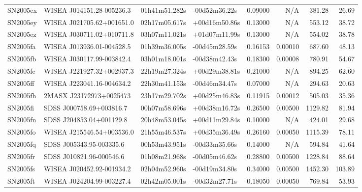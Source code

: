 \begin{longtable}{llllrrrr}
SN2005ex         &       WISEA J014151.28-005236.3 &   01h41m51.282s &   -00d52m36.22s &  0.09000 &      N/A &   381.28 &       26.69 \\
SN2005ey         &       WISEA J021705.62+001651.0 &   02h17m05.617s &   +00d16m50.86s &  0.13000 &      N/A &   553.12 &       38.72 \\
SN2005ez         &       WISEA J030711.02+010711.8 &   03h07m11.021s &   +01d07m11.99s &  0.13000 &      N/A &   554.02 &       38.78 \\
SN2005fa         &       WISEA J013936.01-004528.5 &   01h39m36.005s &   -00d45m28.59s &  0.16153 &  0.00010 &   687.60 &       48.13 \\
SN2005fb         &       WISEA J030117.99-003842.4 &   03h01m18.001s &   -00d38m42.43s &  0.18300 &  0.00008 &   780.91 &       54.67 \\
SN2005fe         &       WISEA J221927.32+002937.3 &   22h19m27.324s &   +00d29m38.81s &  0.21000 &      N/A &   894.25 &       62.60 \\
SN2005ff         &       WISEA J223041.16-004634.2 &   22h30m41.153s &   -00d46m34.47s &  0.07000 &      N/A &   294.63 &       20.63 \\
SN2005fh         &         2MASX J23172973+0025473 &   23h17m29.702s &   +00d25m46.83s &  0.11915 &  0.00012 &   505.03 &       35.36 \\
SN2005fi         &        SDSS J000758.69+003816.7 &   00h07m58.696s &   +00d38m16.72s &  0.26500 &  0.00500 &  1129.82 &       81.94 \\
SN2005fn         &        SDSS J204853.04+001129.8 &   20h48m53.045s &   +00d11m29.84s &  0.10000 &      N/A &   424.01 &       29.68 \\
SN2005fo         &       WISEA J215546.54+003536.0 &   21h55m46.537s &   +00d35m36.49s &  0.26160 &  0.00050 &  1115.39 &       78.11 \\
SN2005fq         &        SDSS J005343.95-003335.6 &   00h53m43.951s &   -00d33m35.66s &  0.14000 &      N/A &   594.84 &       41.64 \\
SN2005fr         &        SDSS J010821.96-000546.6 &   01h08m21.968s &   -00d05m46.62s &  0.28800 &  0.00500 &  1228.84 &       88.64 \\
SN2005fs         &       WISEA J020452.92-001934.2 &   02h04m52.960s &   -00d19m34.80s &  0.34000 &  0.00500 &  1452.30 &      103.89 \\
SN2005ft         &       WISEA J024204.99-003227.4 &   02h42m05.001s &   -00d32m27.71s &  0.18050 &  0.00050 &   769.84 &       53.93 \\

\end{longtable}
